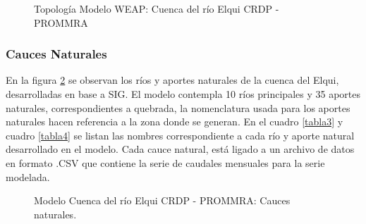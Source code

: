 \documentclass[11pt,]{article}
\begin{document}
\begin{figure}[H]
\begin{center}
\caption{Topología Modelo WEAP: Cuenca del río Elqui CRDP - PROMMRA}
\label{etiqueta_figura6}
\end{center}
\end{figure}

\subsubsection{Cauces Naturales}\bigskip

En la figura \ref{etiqueta_figura7} se observan los ríos y aportes naturales de la cuenca del Elqui, desarrolladas en base a SIG. El modelo contempla 10 ríos principales y 35 aportes naturales, correspondientes a quebrada, la nomenclatura usada para los aportes naturales hacen referencia a la zona donde se generan. En el cuadro \ref{tabla3} y cuadro \ref{tabla4} se listan las nombres correspondiente a cada río y aporte natural desarrollado en el modelo. Cada cauce natural, está ligado a un archivo de datos en formato .CSV que contiene la serie de caudales mensuales para la serie modelada. 
	
\begin{figure}[H]
\begin{center}
\caption{Modelo Cuenca del río Elqui CRDP - PROMMRA: Cauces naturales.}
\label{etiqueta_figura7}
\end{center}
\end{figure}
\end{document}
